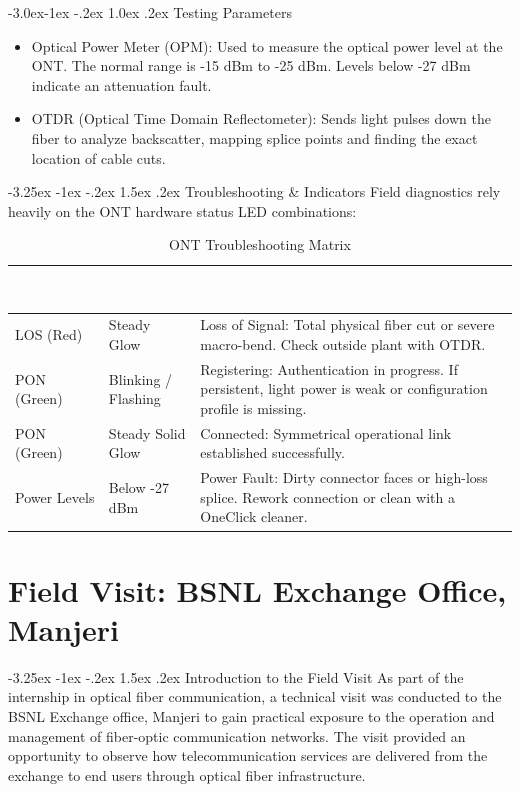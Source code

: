 \documentclass[11pt,a4paper]{report}
\makeatletter
\renewcommand{\section}{\@startsection{section}{1}{\z@}%
  {-3.25ex \@plus -1ex \@minus -.2ex}%
  {1.5ex \@plus.2ex}%
  {\normalfont\Large\bfseries\color{primaryColor}}}
\renewcommand{\subsection}{\@startsection{subsection}{2}{\z@}%
  {-3.0ex\@plus -1ex \@minus -.2ex}%
  {1.0ex \@plus .2ex}%
  {\normalfont\large\bfseries\color{secondaryColor}}}
\makeatother
\begin{document}
\subsection{Testing Parameters}
\begin{itemize}
  \item Optical Power Meter (OPM): Used to measure the optical power level at the ONT. The normal range is -15 dBm to -25 dBm. Levels below -27 dBm indicate an attenuation fault.
  \item OTDR (Optical Time Domain Reflectometer): Sends light pulses down the fiber to analyze backscatter, mapping splice points and finding the exact location of cable cuts.
\end{itemize}
\section{Troubleshooting \& Indicators}
Field diagnostics rely heavily on the ONT hardware status LED combinations:
\begin{table}[H]
\centering
\begin{tabularx}{\textwidth}{l l X}
\rowcolor{primaryColor}
\textcolor{white}{\textbf{ONT Indicator}} & \textcolor{white}{\textbf{Status State}} & \textcolor{white}{\textbf{Meaning / Corrective Action}} \\
\midrule
LOS (Red) & Steady Glow & Loss of Signal: Total physical fiber cut or severe macro-bend. Check outside plant with OTDR. \\
PON (Green) & Blinking / Flashing & Registering: Authentication in progress. If persistent, light power is weak or configuration profile is missing. \\
PON (Green) & Steady Solid Glow & Connected: Symmetrical operational link established successfully. \\
Power Levels & Below -27 dBm & Power Fault: Dirty connector faces or high-loss splice. Rework connection or clean with a OneClick cleaner. \\
\bottomrule
\end{tabularx}
\caption{ONT Troubleshooting Matrix}
\end{table}
\chapter{Field Visit: BSNL Exchange Office, Manjeri}
\section{Introduction to the Field Visit}
As part of the internship in optical fiber communication, a technical visit was conducted to the BSNL Exchange office, Manjeri to gain practical exposure to the operation and management of fiber-optic communication networks. The visit provided an opportunity to observe how telecommunication services are delivered from the exchange to end users through optical fiber infrastructure.
\end{document}
